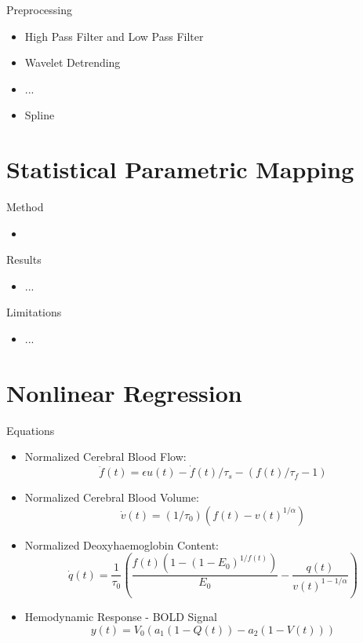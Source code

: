 \documentclass{beamer}
\begin{document}
\begin{frame}{Preprocessing}
  \begin{itemize}
    \item High Pass Filter and Low Pass Filter
    \item Wavelet Detrending
    \item ...
    \item Spline
  \end{itemize}
\end{frame}

\section{Statistical Parametric Mapping}
\begin{frame}{Method}
  \begin{itemize}
    \item
  \end{itemize}
\end{frame}

\begin{frame}{Results}
  \begin{itemize}
    \item ...
  \end{itemize}
\end{frame}

\begin{frame}{Limitations}
  \begin{itemize}
    \item ...
  \end{itemize}
\end{frame}

\section{Nonlinear Regression}
\begin{frame}{Equations}
  \begin{itemize}
    \item Normalized Cerebral Blood Flow:
    $$\ddot{f}(t) = \epsilon u(t) - \dot{f}(t)/\tau_s - (f(t)/\tau_f - 1)$$
    \item Normalized Cerebral Blood Volume:
    $$\dot{v}(t) = (1/\tau_0)( f(t) - v(t) ^ {1/\alpha}) $$
    \item Normalized Deoxyhaemoglobin Content:
    $$\dot{q}(t) = \frac{1}{\tau_0}\left(\frac{f(t)(1- (1-E_0)^{1/f(t)})}{E_0} - 
            \frac{q(t)}{v(t)^{1-1/\alpha}}\right)$$
    \item Hemodynamic Response - BOLD Signal
    $$y(t) = V_0(a_1( 1 - Q(t)) - a_2(1 - V(t)))$$
  \end{itemize}
\end{frame}
\end{document}
